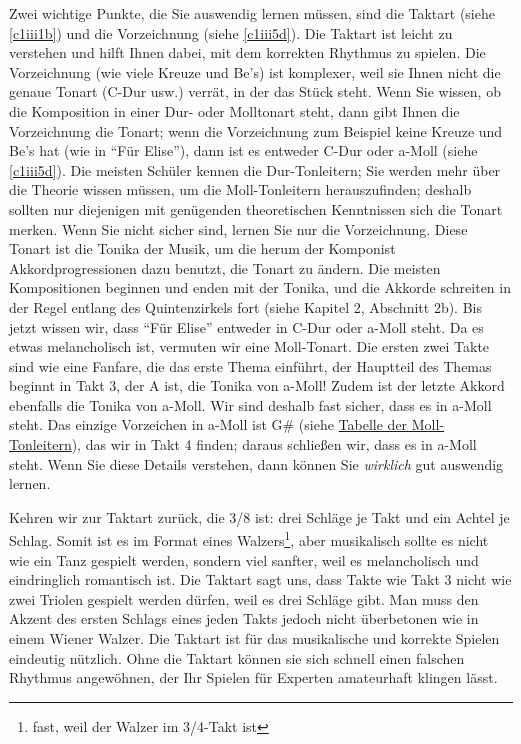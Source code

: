 Zwei wichtige Punkte, die Sie auswendig lernen müssen, sind die Taktart (siehe \hyperref[c1iii1b]{\ref*{c1iii1b}}) und die Vorzeichnung (siehe \hyperref[c1iii5d]{\ref*{c1iii5d}}).
Die Taktart ist leicht zu verstehen und hilft Ihnen dabei, mit dem korrekten Rhythmus zu spielen.
Die Vorzeichnung (wie viele Kreuze und Be's) ist komplexer, weil sie Ihnen nicht die genaue Tonart (C-Dur usw.) verrät, in der das Stück steht.
Wenn Sie wissen, ob die Komposition in einer Dur- oder Molltonart steht, dann gibt Ihnen die Vorzeichnung die Tonart; wenn die Vorzeichnung zum Beispiel keine Kreuze und Be's hat (wie in \enquote{Für Elise}), dann  ist es entweder C-Dur oder a-Moll (siehe \ref*{c1iii5d}).
Die meisten Schüler kennen die Dur-Tonleitern; Sie werden mehr über die Theorie wissen müssen, um die Moll-Tonleitern herauszufinden;
deshalb sollten nur diejenigen mit genügenden theoretischen Kenntnissen sich die Tonart merken.
Wenn Sie nicht sicher sind, lernen Sie nur die Vorzeichnung.
Diese Tonart ist die Tonika der Musik, um die herum der Komponist Akkordprogressionen dazu benutzt, die Tonart zu ändern.
Die meisten Kompositionen beginnen und enden mit der Tonika, und die Akkorde schreiten in der Regel entlang des Quintenzirkels fort (siehe Kapitel 2, Abschnitt 2b). Bis jetzt wissen wir, dass \enquote{Für Elise} entweder in C-Dur oder a-Moll steht.
Da es etwas melancholisch ist, vermuten wir eine Moll-Tonart.
Die ersten zwei Takte sind wie eine Fanfare, die das erste Thema einführt, der Hauptteil des Themas beginnt in Takt 3, der A ist, die Tonika von a-Moll!
Zudem ist der letzte Akkord ebenfalls die Tonika von a-Moll.
Wir sind deshalb fast sicher, dass es in a-Moll steht.
Das einzige Vorzeichen in a-Moll ist G\# (siehe \hyperref[tablemoll]{Tabelle der Moll-Tonleitern}), das wir in Takt 4 finden; daraus schließen wir, dass es in a-Moll steht.
Wenn Sie diese Details verstehen, dann können Sie \textit{wirklich} gut auswendig lernen.

Kehren wir zur Taktart zurück, die 3/8 ist: drei Schläge je Takt und ein Achtel je Schlag.
Somit ist es im Format eines Walzers\footnote{fast, weil der Walzer im 3/4-Takt ist}, aber musikalisch sollte es nicht wie ein Tanz gespielt werden, sondern viel sanfter, weil es melancholisch und eindringlich romantisch ist.
Die Taktart sagt uns, dass Takte wie Takt 3 nicht wie zwei Triolen gespielt werden dürfen, weil es drei Schläge gibt.
Man muss den Akzent des ersten Schlags eines jeden Takts jedoch nicht überbetonen wie in einem Wiener Walzer.
Die Taktart ist für das musikalische und korrekte Spielen eindeutig  nützlich.
Ohne die Taktart können sie sich schnell einen falschen Rhythmus angewöhnen, der Ihr Spielen für Experten amateurhaft klingen lässt.

